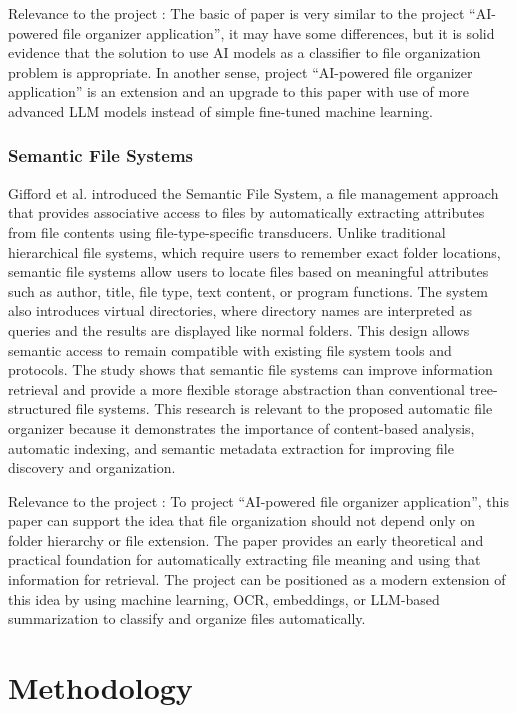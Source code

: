 \documentclass[12pt,oneside,openright,a4paper]{cpe-english-project}
\begin{document}
Relevance to the project :  The basic of paper is very similar to the project ``AI-powered file organizer application'', it may have some differences, but it is solid evidence that the solution to use AI models as a classifier to file organization problem is appropriate. In another sense, project ``AI-powered file organizer application'' is an extension and an upgrade to this paper with use of more advanced LLM models instead of simple fine-tuned machine learning.

\subsection{Semantic File Systems}
Gifford et al. introduced the Semantic File System, a file management approach that provides associative access to files by automatically extracting attributes from file contents using file-type-specific transducers. Unlike traditional hierarchical file systems, which require users to remember exact folder locations, semantic file systems allow users to locate files based on meaningful attributes such as author, title, file type, text content, or program functions. The system also introduces virtual directories, where directory names are interpreted as queries and the results are displayed like normal folders. This design allows semantic access to remain compatible with existing file system tools and protocols. The study shows that semantic file systems can improve information retrieval and provide a more flexible storage abstraction than conventional tree-structured file systems. This research is relevant to the proposed automatic file organizer because it demonstrates the importance of content-based analysis, automatic indexing, and semantic metadata extraction for improving file discovery and organization.

Relevance to the project : To project ``AI-powered file organizer application'', this paper can support the idea that file organization should not depend only on folder hierarchy or file extension. The paper provides an early theoretical and practical foundation for automatically extracting file meaning and using that information for retrieval. The project can be positioned as a modern extension of this idea by using machine learning, OCR, embeddings, or LLM-based summarization to classify and organize files automatically.

\chapter{Methodology}
\end{document}
